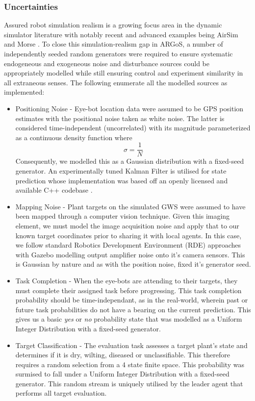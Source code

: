\documentclass{report}
\begin{document}
\subsubsection{Uncertainties}
Assured robot simulation realism is a growing focus area \cite{Taylor2014} in the dynamic simulator literature with notably recent and advanced examples being AirSim \cite{Shah2018} and Morse \cite{Morse2011} \cite{Lemaignan2014}. To close this simulation-realism gap in ARGoS, a number of independently seeded random generators were required to ensure systematic endogeneous and exogeneous noise and disturbance sources could be appropriately modelled while still ensuring control and experiment similarity in all extraneous senses. The following enumerate all the modelled sources as implemented:

\begin{itemize}
	\item Positioning Noise - Eye-bot location data were assumed to be GPS position estimates with the positional noise taken as white noise. The latter is considered time-independent (uncorrelated) with its magnitude parameterized as a continuous density function where $$\sigma = \frac{1}{N} $$ Consequently, we modelled this as a Gaussian distribution with a fixed-seed generator. An experimentally tuned Kalman Filter is utilised for state prediction whose implementation was based off an openly licensed and available C++ codebase \cite{KALMAN2015}.
	\item Mapping Noise - Plant targets on the simulated GWS were assumed to have been mapped through a computer vision technique. Given this imaging element, we must model the image acquisition noise and apply that to our known target coordinates prior to sharing it with local agents. In this case, we follow standard Robotics Development Environment (RDE) approaches with Gazebo \cite{Koenig2004} modelling output amplifier noise onto it's camera sensors. This is Gaussian by nature and as with the position noise, fixed it's generator seed.
	\item Task Completion - When the eye-bots are attending to their targets, they must complete their assigned task before progressing. This task completion probability should be time-independant, as in the real-world, wherein past or future task probabilities do not have a bearing on the current prediction. This gives us a basic \textit{yes} or \textit{no} probability state that was modelled as a Uniform Integer Distribution with a fixed-seed generator.
	\item Target Classification - The evaluation task assesses a target plant's state and determines if it is dry, wilting, diseased or unclassifiable. This therefore requires a random selection from a 4 state finite space. This probability was surmised to fall under a Uniform Integer Distribution with a fixed-seed generator. This random stream is uniquely utilised by the leader agent that performs all target evaluation.

\end{itemize}
\end{document}
